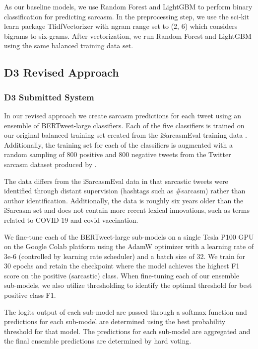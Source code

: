 \documentclass[11pt]{article}
\begin{document}
As our baseline models, we use Random Forest and LightGBM \citealp{ke2017lightgbm} to perform binary classification for predicting sarcasm. In the preprocessing step, we use the sci-kit learn package \citealp{DBLP:journals/corr/abs-1201-0490} TfidfVectorizer with ngram range set to (2, 6) which considers bigrams to six-grams. After vectorization, we run Random Forest and LightGBM using the same balanced training data set.


\subsection{D3 Revised Approach}
\subsubsection{D3 Submitted System}
In our revised approach we create sarcasm predictions for each tweet using an ensemble of BERTweet-large classifiers. Each of the five classifiers is trained on our original balanced training set created from the iSarcasmEval training data \citealp{oprea-magdy-2020-isarcasm}. Additionally, the training set for each of the classifiers is augmented with a random sampling of 800 positive and 800 negative tweets from the Twitter sarcasm dataset produced by \citealp{Ptcek2014SarcasmDO}. 

The  \citealp{Ptcek2014SarcasmDO} data differs from the iSarcasmEval data in that sarcastic tweets were identified through distant supervision (hashtags such as #sarcasm) rather than author identification. Additionally, the \citealp{Ptcek2014SarcasmDO} data is roughly six years older than the iSarcasm set and does not contain more recent lexical innovations, such as terms related to COVID-19 and covid vaccination.

We fine-tune each of the BERTweet-large sub-models on a single Tesla P100 GPU on the Google Colab platform using the AdamW optimizer with a learning rate of 3e-6 (controlled by learning rate scheduler) and a batch size of 32. We train for 30 epochs and retain the checkpoint where the model achieves the highest F1 score on the positive (sarcastic) class. When fine-tuning each of our ensemble sub-models, we also utilize thresholding \citealp{sheng-threshold} to identify the optimal threshold for best positive class F1. 

The logits output of each sub-model are passed through a softmax function and predictions for each sub-model are determined using the best probability threshold for that model. The predictions for each sub-model are aggregated and the final ensemble predictions are determined by hard voting. 
\end{document}
